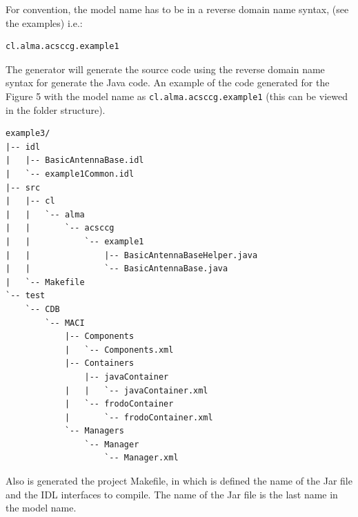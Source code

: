 For convention, the model name has to be in a reverse domain name syntax,
(see the examples) i.e.:
\begin{center}
\begin{verbatim}
cl.alma.acsccg.example1
\end{verbatim}
\end{center}
The generator will generate the source code using the reverse domain name
syntax for generate the Java code. An example of the code generated for the
Figure 5 with the model name as \verb+cl.alma.acsccg.example1+ (this can be viewed in the folder structure).
\begin{center}
\begin{verbatim}
example3/
|-- idl
|   |-- BasicAntennaBase.idl
|   `-- example1Common.idl
|-- src
|   |-- cl
|   |   `-- alma
|   |       `-- acsccg
|   |           `-- example1
|   |               |-- BasicAntennaBaseHelper.java
|   |               `-- BasicAntennaBase.java
|   `-- Makefile
`-- test
    `-- CDB
        `-- MACI
            |-- Components
            |   `-- Components.xml
            |-- Containers
            	|-- javaContainer
            |   |   `-- javaContainer.xml
            |   `-- frodoContainer
            |       `-- frodoContainer.xml
            `-- Managers
                `-- Manager
                    `-- Manager.xml
\end{verbatim}
\end{center}

Also is generated the project Makefile, in which is defined the name of
the Jar file and the IDL interfaces to compile. The name of the Jar file is the last
name in the model name.

\newpage


